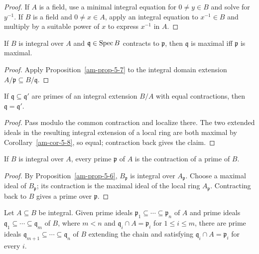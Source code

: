 \begin{proof}
If $A$ is a field, use a minimal integral equation for $0\ne y\in B$ and
solve for $y^{-1}$.  If $B$ is a field and $0\ne x\in A$, apply an integral
equation to $x^{-1}\in B$ and multiply by a suitable power of $x$ to express
$x^{-1}$ in $A$.
\end{proof}
\begin{corollary}
\label{am-cor-5-8}
\uses{}
If $B$ is integral over $A$ and $\mathfrak{q}\in\operatorname{Spec} B$ contracts to $\mathfrak{p}$, then $\mathfrak{q}$ is
maximal iff $\mathfrak{p}$ is maximal.
\end{corollary}
\begin{proof}
Apply Proposition~\ref{am-prop-5-7} to the integral domain extension
$A/\mathfrak{p}\subseteq B/\mathfrak{q}$.
\end{proof}
\begin{corollary}[Incomparability]
\label{am-cor-5-9}
\uses{}
If $\mathfrak{q}\subseteq\mathfrak{q}'$ are primes of an integral extension $B/A$ with equal
contractions, then $\mathfrak{q}=\mathfrak{q}'$.
\end{corollary}
\begin{proof}
Pass modulo the common contraction and localize there.  The two extended
ideals in the resulting integral extension of a local ring are both maximal by
Corollary~\ref{am-cor-5-8}, so equal; contraction back gives the claim.
\end{proof}
\begin{theorem}
\label{am-thm-5-10}
\uses{}
If $B$ is integral over $A$, every prime $\mathfrak{p}$ of $A$ is the contraction of a
prime of $B$.
\end{theorem}
\begin{proof}
By Proposition~\ref{am-prop-5-6}, $B_\mathfrak{p}$ is integral over $A_\mathfrak{p}$.  Choose a
maximal ideal of $B_\mathfrak{p}$; its contraction is the maximal ideal of the local
ring $A_\mathfrak{p}$.  Contracting back to $B$ gives a prime over $\mathfrak{p}$.
\end{proof}
\begin{theorem}[Going up]
\label{am-thm-5-11}
\uses{}
Let $A\subseteq B$ be integral.  Given prime ideals
$\mathfrak{p}_1\subseteq\cdots\subseteq\mathfrak{p}_n$ of $A$ and prime ideals
$\mathfrak{q}_1\subseteq\cdots\subseteq\mathfrak{q}_m$ of $B$, where $m<n$ and
$\mathfrak{q}_i\cap A=\mathfrak{p}_i$ for $1\le i\le m$, there are prime ideals
$\mathfrak{q}_{m+1}\subseteq\cdots\subseteq\mathfrak{q}_n$ of $B$ extending
the chain and satisfying $\mathfrak{q}_i\cap A=\mathfrak{p}_i$ for every $i$.
\end{theorem}
